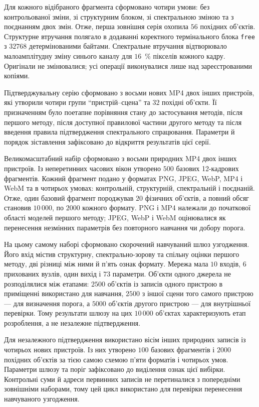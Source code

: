 Для кожного відібраного фрагмента сформовано чотири умови: без контрольованої зміни, зі структурним блоком, зі спектральною зміною та з поєднанням двох змін. Отже, перша зовнішня серія охопила $56$ похідних об’єктів. Структурне втручання полягало в додаванні коректного термінального блока \texttt{free} з $32768$ детермінованими байтами. Спектральне втручання відтворювало малоамплітудну зміну синього каналу для $16$~\% пікселів кожного кадру. Оригінали не змінювалися; усі операції виконувалися лише над зареєстрованими копіями.

Підтверджувальну серію сформовано з восьми нових MP4 двох інших пристроїв, які утворили чотири групи ``пристрій--сцена'' та $32$ похідні об’єкти. Її призначенням було поетапне порівняння стану до застосування методів, після першого методу, після доступної правилової частини другого методу та після введення правила підтвердження спектрального спрацювання. Параметри й порядок зіставлення зафіксовано до відкриття результатів цієї серії.

Великомасштабний набір сформовано з восьми природних MP4 двох інших пристроїв. Із неперетинних часових вікон утворено $500$ базових 12-кадрових фрагментів. Кожний фрагмент подано у форматах PNG, JPEG, WebP, MP4 і WebM та в чотирьох умовах: контрольній, структурній, спектральній і поєднаній. Отже, один базовий фрагмент породжував $20$ фізичних об’єктів, а повний обсяг становив $10\,000$, по $2000$ кожного формату. PNG і MP4 належали до початкової області моделей першого методу; JPEG, WebP і WebM оцінювалися як перенесення незмінних параметрів без повторного навчання чи добору порога.

На цьому самому наборі сформовано скорочений навчуваний шлюз узгодження. Його вхід містив структурну, спектрально-зорову та спільну оцінки першого методу, дві різниці між ними й п’ять ознак формату. Мережа мала $10$ входів, $6$ прихованих вузлів, один вихід і $73$ параметри. Об’єкти одного джерела не розподілялися між етапами: $2500$ об’єктів із записів одного пристрою в приміщенні використано для навчання, $2500$ з іншої сцени того самого пристрою --- для визначення порога, а $5000$ об’єктів другого пристрою --- для внутрішньої перевірки. Тому результати шлюзу на цих $10\,000$ об’єктах характеризують етап розроблення, а не незалежне підтвердження.

Для незалежного підтвердження використано вісім інших природних записів із чотирьох нових пристроїв. Із них утворено $100$ базових фрагментів і $2000$ похідних об’єктів за тією самою схемою п’яти форматів і чотирьох умов. Параметри шлюзу та поріг зафіксовано до виділення ознак цієї вибірки. Контрольні суми й адреси первинних записів не перетиналися з попередніми зовнішніми наборами, тому цей цикл використано для перевірки перенесення навчуваного узгодження.


